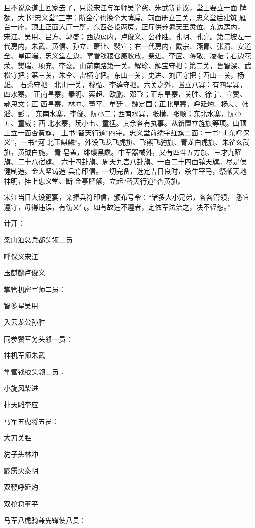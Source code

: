 且不说众道士回家去了，只说宋江与军师吴学究、朱武等计议，堂上要立一面
牌额，大书“忠义堂”三字；断金亭也换个大牌扁。前面册立三关，忠义堂后建筑
雁台一座，顶上正面大厅一所，东西各设两房。正厅供养晁天王灵位。东边房内，
宋江、吴用、吕方、郭盛；西边房内，卢俊义、公孙胜、孔明、孔亮。第二坡左一
代房内，朱武、黄信、孙立、萧让、裴宣；右一代房内，戴宗、燕青、张清、安道
全、皇甫端。忠义堂左边，掌管钱粮仓廒收放，柴进、李应、蒋敬、凌振；右边花
荣、樊瑞、项充、李衮。山前南路第一关，解珍、解宝守把；第二关，鲁智深、武
松守把；第三关，朱仝、雷横守把。东山一关，史进、刘唐守把；西山一关，杨雄、
石秀守把；北山一关，穆弘、李逵守把。六关之外，置立八寨：有四旱寨，四水寨。
正南旱寨，秦明、索超、欧鹏、邓飞；正东旱寨，关胜、徐宁、宣赞、郝思文；正
西旱寨，林冲、董平、单廷、魏定国；正北旱寨，呼延灼、杨志、韩滔、彭。
东南水寨，李俊、阮小二；西南水寨，张横、张顺；东北水寨，阮小五、童威；西
北水寨，阮小七、童猛。其余各有执事。从新置立旌旗等项。山顶上立一面杏黄旗，
上书“替天行道”四字。忠义堂前绣字红旗二面：一书“山东呼保义”，一书“河
北玉麒麟”。外设飞龙飞虎旗、飞熊飞豹旗、青龙白虎旗、朱雀玄武旗，黄钺白旄，
青皂盖，绯缨黑纛。中军器械外，又有四斗五方旗、三才九曜旗、二十八宿旗、
六十四卦旗、周天九宫八卦旗、一百二十四面镇天旗。尽是侯健制造。金大坚铸造
兵符印信。一切完备，选定吉日良时，杀牛宰马，祭献天地神明，挂上忠义堂、断
金亭牌额，立起“替天行道”杏黄旗。

宋江当日大设筵宴，亲捧兵符印信，颁布号令：“诸多大小兄弟，各各管领，
悉宜遵守，毋得违误，有伤义气。如有故违不遵者，定依军法治之，决不轻恕。”

计开：

梁山泊总兵都头领二员：

呼保义宋江

玉麒麟卢俊义

掌管机密军师二员：

智多星吴用

入云龙公孙胜

同参赞军务头领一员：

神机军师朱武

掌管钱粮头领二员：

小旋风柴进

扑天雕李应

马军五虎将五员：

大刀关胜

豹子头林冲

霹雳火秦明

双鞭呼延灼

双枪将董平

马军八虎骑兼先锋使八员：

